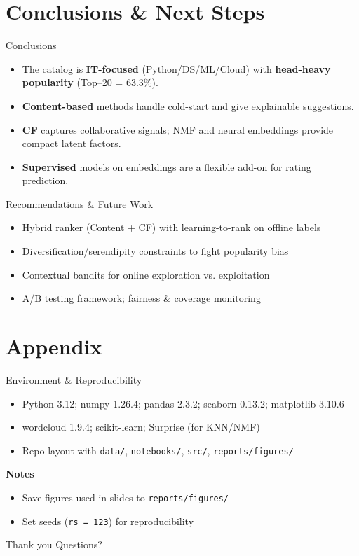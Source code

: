 \documentclass[aspectratio=169]{beamer}
\begin{document}
\section{Conclusions \& Next Steps}

\begin{frame}{Conclusions}
\begin{itemize}
  \item The catalog is \textbf{IT-focused} (Python/DS/ML/Cloud) with \textbf{head-heavy popularity} (Top–20 = 63.3\%).
  \item \textbf{Content-based} methods handle cold-start and give explainable suggestions.
  \item \textbf{CF} captures collaborative signals; NMF and neural embeddings provide compact latent factors.
  \item \textbf{Supervised} models on embeddings are a flexible add-on for rating prediction.
\end{itemize}
\end{frame}

\begin{frame}{Recommendations \& Future Work}
\begin{itemize}
  \item Hybrid ranker (Content + CF) with learning-to-rank on offline labels
  \item Diversification/serendipity constraints to fight popularity bias
  \item Contextual bandits for online exploration vs. exploitation
  \item A/B testing framework; fairness \& coverage monitoring
\end{itemize}
\end{frame}

\section{Appendix}

\begin{frame}{Environment \& Reproducibility}
\begin{itemize}
  \item Python 3.12; numpy 1.26.4; pandas 2.3.2; seaborn 0.13.2; matplotlib 3.10.6
  \item wordcloud 1.9.4; scikit-learn; Surprise (for KNN/NMF)
  \item Repo layout with \texttt{data/}, \texttt{notebooks/}, \texttt{src/}, \texttt{reports/figures/}
\end{itemize}

\textbf{Notes}
\begin{itemize}
  \item Save figures used in slides to \texttt{reports/figures/}
  \item Set seeds (\texttt{rs = 123}) for reproducibility
\end{itemize}
\end{frame}

\begin{frame}{Thank you}
\centering
\Large Questions?
\end{frame}
\end{document}
